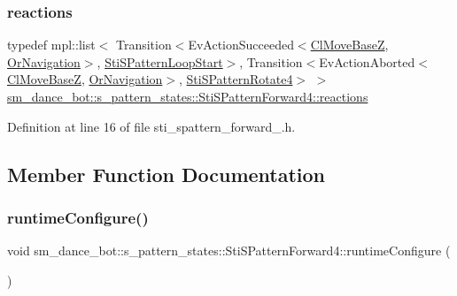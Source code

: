 \subsubsection{\texorpdfstring{reactions}{reactions}}
{\footnotesize\ttfamily typedef mpl\+::list$<$ Transition$<$Ev\+Action\+Succeeded$<$\hyperlink{classmove__base__z__client_1_1ClMoveBaseZ}{Cl\+Move\+BaseZ}, \hyperlink{classsm__dance__bot_1_1OrNavigation}{Or\+Navigation}$>$, \hyperlink{structsm__dance__bot_1_1s__pattern__states_1_1StiSPatternLoopStart}{Sti\+S\+Pattern\+Loop\+Start}$>$, Transition$<$Ev\+Action\+Aborted$<$\hyperlink{classmove__base__z__client_1_1ClMoveBaseZ}{Cl\+Move\+BaseZ}, \hyperlink{classsm__dance__bot_1_1OrNavigation}{Or\+Navigation}$>$, \hyperlink{structsm__dance__bot_1_1s__pattern__states_1_1StiSPatternRotate4}{Sti\+S\+Pattern\+Rotate4}$>$ $>$ \hyperlink{structsm__dance__bot_1_1s__pattern__states_1_1StiSPatternForward4_a4a0eaecaf39945c6a9b01c8536898455}{sm\+\_\+dance\+\_\+bot\+::s\+\_\+pattern\+\_\+states\+::\+Sti\+S\+Pattern\+Forward4\+::reactions}}



Definition at line 16 of file sti\+\_\+spattern\+\_\+forward\+\_.\+h.



\subsection{Member Function Documentation}
\mbox{\label{structsm__dance__bot_1_1s__pattern__states_1_1StiSPatternForward4_ad1bb20f5c465c5547da170da2d9c3292}} 
\subsubsection{\texorpdfstring{runtime\+Configure()}{runtimeConfigure()}}
{\footnotesize\ttfamily void sm\+\_\+dance\+\_\+bot\+::s\+\_\+pattern\+\_\+states\+::\+Sti\+S\+Pattern\+Forward4\+::runtime\+Configure (\begin{DoxyParamCaption}{ }\end{DoxyParamCaption})\hspace{0.3cm}{\ttfamily [inline]}}



